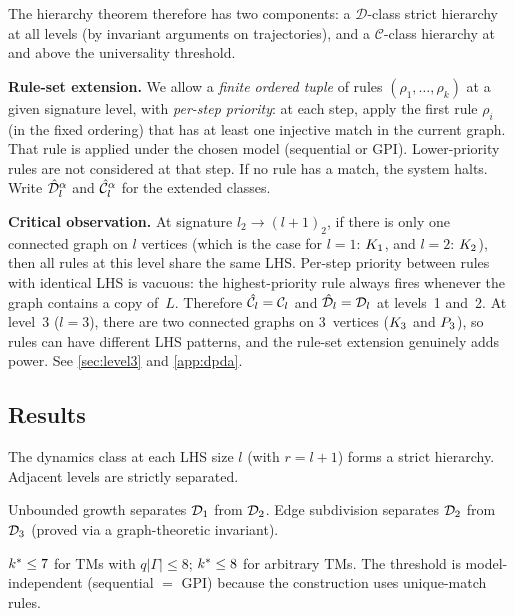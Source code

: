 \documentclass{../shared/primo}
\begin{document}
The hierarchy theorem therefore has two components: a $\mathcal{D}$-class strict hierarchy at all levels (by invariant arguments on trajectories), and a $\mathcal{C}$-class hierarchy at and above the universality threshold.

\textbf{Rule-set extension.} We allow a \emph{finite ordered tuple} of rules $(\rho_1, \ldots, \rho_k)$ at a given signature level, with \emph{per-step priority}: at each step, apply the first rule $\rho_i$ (in the fixed ordering) that has at least one injective match in the current graph. That rule is applied under the chosen model (sequential or GPI). Lower-priority rules are not considered at that step. If no rule has a match, the system halts. Write $\hat{\mathcal{D}}_{l}^{\alpha}$ and $\hat{\mathcal{C}}_{l}^{\alpha}$ for the extended classes.

\textbf{Critical observation.} At signature $l_2 \to (l{+}1)_2$, if there is only one connected graph on $l$ vertices (which is the case for $l = 1$: $K_{1}$, and $l = 2$: $K_{2}$), then all rules at this level share the same LHS\@. Per-step priority between rules with identical LHS is vacuous: the highest-priority rule always fires whenever the graph contains a copy of~$L$. Therefore $\hat{\mathcal{C}}_{l} = \mathcal{C}_{l}$ and $\hat{\mathcal{D}}_{l} = \mathcal{D}_{l}$ at levels~1 and~2. At level~3 ($l = 3$), there are two connected graphs on 3~vertices ($K_{3}$ and $P_{3}$), so rules can have different LHS patterns, and the rule-set extension genuinely adds power. See \cref{sec:level3} and \cref{app:dpda}.

\subsection{Results}

\begin{theorem}[Hierarchy]\label{thm:hierarchy}
The dynamics class at each LHS size $l$ (with $r = l + 1$) forms a strict hierarchy. Adjacent levels are strictly separated.
\end{theorem}

\begin{theorem}\label{thm:separations}
Unbounded growth separates $\mathcal{D}_{1}$ from $\mathcal{D}_{2}$. Edge subdivision separates $\mathcal{D}_{2}$ from $\mathcal{D}_{3}$ (proved via a graph-theoretic invariant).
\end{theorem}

\begin{theorem}[Universality]\label{thm:universality}
$k^* \leq 7$ for TMs with $q|\Gamma| \leq 8$; $k^* \leq 8$ for arbitrary TMs. The threshold is model-independent (sequential $=$ GPI) because the construction uses unique-match rules.
\end{theorem}
\end{document}
